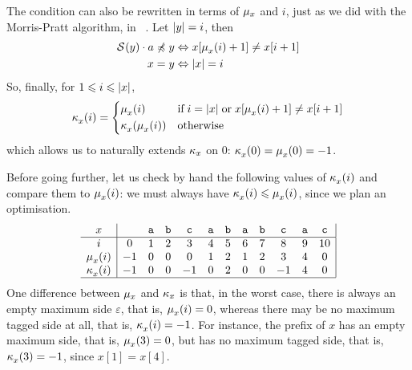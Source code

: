 \label{gamma_ref_def}
The condition can also be rewritten in terms of \(\mu_{x}\)
and \(i\), just as we did with the Morris-Pratt algorithm, in
\fig~\pageref{fig:mp}. Let \(\lvert{y}\lvert{} = i\), then
\begin{align*}
  \mathcal{S}^{}(y) \cdot a \not\preccurlyeq y
& \Leftrightarrow x [\mu_{x}^{}(i) + 1] \neq x [i + 1]\\
  x = y
& \Leftrightarrow \lvert{x}\lvert{} = i
\end{align*}
So, finally, for \(1 \leqslant i \leqslant \lvert{x}\lvert{}\),
\[
  \kappa_{x}^{}(i)
= \left\lbrace
  \begin{aligned}
    &  \mu_{x}^{}(i)
    && \text{if} \; i = \lvert{x}\lvert{} \; \text{or} 
       \; x [\mu_{x}^{}(i) + 1] \neq x [i + 1]\\
    &  \kappa_{x}^{}(\mu_{x}^{}(i))
    && \text{otherwise}
  \end{aligned}
  \right.
\]
which allows us to naturally extends \(\kappa_{x}\) on \(0\): 
\(\kappa_{x}^{}(0) = \mu_{x}^{}(0) = -1\).

Before going further, let us check by hand the following values of
\(\kappa_{x}^{}(i)\) and compare them to \(\mu_{x}^{}(i)\): we must
always have \(\kappa_{x}^{}(i) \leqslant \mu_{x}^{}(i)\), since we
plan an optimisation. 
\[
\begin{array}{c|ccccccccccc|}
x & & \texttt{a} & \texttt{b} & \texttt{c} & \texttt{a} 
  & \texttt{b} & \texttt{a} & \texttt{b} & \texttt{c}
  & \texttt{a} & \texttt{c}\\
\hline
                  i  &  0 & 1 & 2 &  3 & 4 & 5 & 6 & 7 &  8 & 9 & 10\\
   \mu_{x}^{}(i) & -1 & 0 & 0 &  0 & 1 & 2 & 1 & 2 &  3 & 4 &  0\\
  \kappa_{x}^{}(i) & -1 & 0 & 0 & -1 & 0 & 2 & 0 & 0 & -1 & 4 &  0\\
\hline
\end{array}
\]
One difference between \(\mu_{x}\) and
\(\kappa_{x}\) is that, in the worst case, there is always an
empty maximum side \(\varepsilon\), that is, \(\mu_{x}^{}(i) = 0\),
whereas there may be no maximum tagged side at all,
that is, \(\kappa_{x}^{}(i) = -1\). For instance, the prefix
 of \(x\) has an empty maximum side,
that is, \(\mu_{x}^{}(3)=0\), but has no maximum tagged side,
that is, \(\kappa_{x}^{}(3) = -1\), since \(x[1] = x[4]\).

